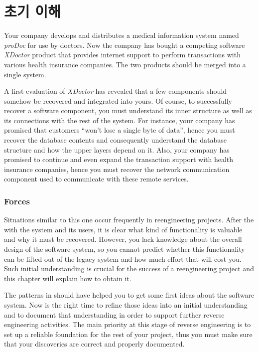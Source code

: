 \documentclass[a4paper,10pt,twoside]{book}
\begin{document}
	\renewcommand{\nnbb}[2]{} %
	\sloppy
\fi
\chapter{초기 이해}

Your company develops and distributes a medical information system named \emph{proDoc} for 
use by doctors. Now the company has bought a competing software \emph{XDoctor} product that 
provides internet support to perform transactions with various health insurance companies. 
The two products should be merged into a single system.

A first evaluation of \emph{XDoctor} has revealed that a few components should somehow be 
recovered and integrated into yours. Of course, to successfully recover a software 
component, you must understand its inner structure as well as its connections with the rest 
of the system. For instance, your company has promised that customers ``won't lose a single 
byte of data'', hence you must recover the database contents and consequently understand 
the database structure and how the upper layers depend on it. Also, your company has 
promised to continue and even expand the transaction support with health insurance 
companies, hence you must recover the network communication component used to communicate 
with these remote services.

\subsection*{Forces}

Situations similar to this one occur frequently in reengineering projects. After the 
 with the system and its users, it is clear what kind 
of functionality is valuable and why it must be recovered. However, you lack knowledge 
about the overall design of the software system, so you cannot predict whether this 
functionality can be lifted out of the legacy system and how much effort that will cost 
you. Such initial understanding is crucial for the success of a reengineering project and 
this chapter will explain how to obtain it.

The patterns in  should have helped you to get some 
first ideas about the software system. Now is the right time to refine those ideas into an 
initial understanding and to document that understanding in order to support further 
reverse engineering activities. The main priority at this stage of reverse engineering is 
to set up a reliable foundation for the rest of your project, thus you must make sure that 
your discoveries are correct and properly documented.
\end{document}
